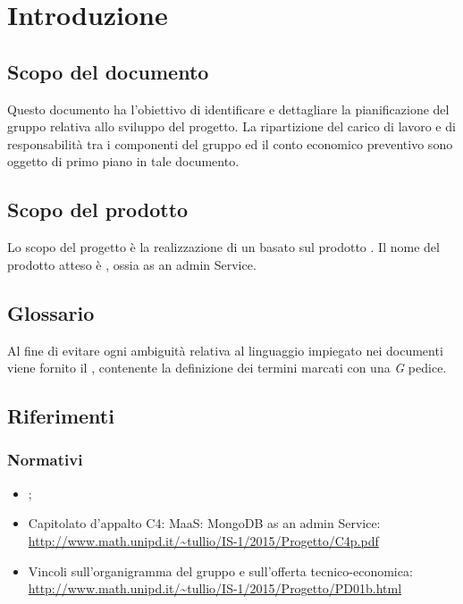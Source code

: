 \section{Introduzione}
\subsection{Scopo del documento}
Questo documento ha l’obiettivo di identificare e dettagliare la pianificazione del gruppo
relativa allo sviluppo del progetto. La ripartizione del carico di lavoro e di responsabilit\`a tra i
componenti del gruppo ed il conto economico preventivo sono oggetto di primo piano in tale documento.

\subsection{Scopo del prodotto}
Lo scopo del progetto \`e la realizzazione di un  basato sul prodotto . Il nome del prodotto atteso \`e , ossia  as an admin Service.

\subsection{Glossario}
Al fine di evitare ogni ambiguit\`a relativa al linguaggio impiegato nei documenti viene fornito il \Glossario, contenente la definizione dei termini marcati con una \textit{G} pedice.

\subsection{Riferimenti}
\subsubsection{Normativi}
\begin{itemize}
\item \NormeDiProgetto;

\item Capitolato d'appalto C4: MaaS: MongoDB as an admin Service: \\ 
\url{http://www.math.unipd.it/~tullio/IS-1/2015/Progetto/C4p.pdf}

\item Vincoli sull’organigramma del gruppo e sull’offerta tecnico-economica: \\
\url{http://www.math.unipd.it/~tullio/IS-1/2015/Progetto/PD01b.html}

\end{itemize}
